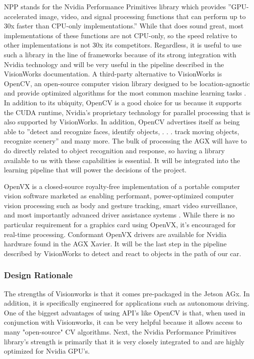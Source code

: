 \documentclass[onecolumn, draftclsnofoot, 10pt, compsoc]{IEEEtran}
\begin{document}
NPP stands for the Nvidia Performance Primitives library which provides ”GPU-accelerated image, video, and signal processing functions that can perform up to 30x faster than CPU-only implementations.” While that does sound great, most implementations of these functions are not CPU-only, so the speed relative to other implementations is not 30x its competitors. Regardless, it is useful to use such a library in the line of frameworks because of its strong integration with Nvidia technology and will be very useful in the pipeline described in the VisionWorks documentation.
A third-party alternative to VisionWorks is OpenCV, an open-source computer vision library designed to be location-agnostic and provide optimized algorithms for the most common machine learning tasks \cite{opencv}. In addition to its ubiquity, OpenCV is a good choice for us because it supports the CUDA runtime, Nvidia’s proprietary technology for parallel processing that is also supported by VisionWorks. In addition, OpenCV advertises itself as being able to ”detect and recognize faces, identify objects, . . . track moving objects, recognize scenery” and many more. The bulk of processing the AGX will have to do directly related to object recognition and response, so having a library available to us with these capabilities is essential. It will be integrated into the learning pipeline that will power the decisions of the project. 

OpenVX is a closed-source royalty-free implementation of a portable computer vision software marketed as enabling performant, power-optimized computer vision processing such as body and gesture tracking, smart video surveillance, and most importantly advanced driver assistance systems \cite{openvx}. While there is no particular requirement for a graphics card using OpenVX, it’s encouraged for real-time processing. Conformant OpenVX drivers are available for Nvidia hardware found in the AGX Xavier. It will be the last step in the pipeline described by VisionWorks to detect and react to objects in the path of our car.

\subsubsection{Design Rationale}
The strengths of Visionworks is that it comes pre-packaged in the Jetson AGx. In addition, it is specifically engineered for applications such as autonomous driving. One of the biggest advantages of using API's like OpenCV is that, when used in conjunction with Visionworks, it can be very helpful because it allows access to many "open-source" CV algorithms. Next, the Nvidia Performance Primitives library's strength is primarily that it is very closely integrated to and are highly optimized for Nvidia GPU's. \cite{nvidia}
 
\end{document}
